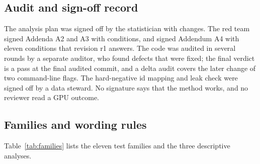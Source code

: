 \subsection{Audit and sign-off record}\label{app:audits}
The analysis plan was signed off by the statistician with changes.
The red team signed Addenda A2 and A3 with conditions, and signed Addendum A4 with eleven conditions that revision r1 answers.
The code was audited in several rounds by a separate auditor, who found defects that were fixed; the final verdict is a pass at the
final audited commit, and a delta audit covers the later change of two command-line flags.
The hard-negative id mapping and leak check were signed off by a data steward.
No signature says that the method works, and no reviewer read a GPU outcome.

\subsection{Families and wording rules}\label{app:families}
Table~\ref{tab:families} lists the eleven test families and the three descriptive analyses.

